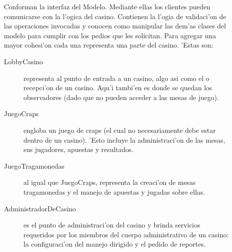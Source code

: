 
\begin{description}
\item[] Conforman la interfaz del Modelo. Mediante ellas los clientes pueden comunicarse con la l'ogica del casino. Contienen la l'ogia de validaci'on de las operaciones invocadas y conocen como manipular las dem'as clases del modelo para cumplir con los pedios que les solicitan. Para agregar una mayor cohesi'on cada una representa una parte del casino. 'Estas son:
	\begin{description}
	\item[LobbyCasino] representa al punto de entrada a un casino, algo asi como el  o recepci'on de un casino. Aqu'i tambi'en es donde se quedan los observadores (dado que no pueden acceder a las mesas de juego).
	\item[JuegoCraps] engloba un juego de craps (el cual no necesariamente debe estar dentro de un casino). 'Esto incluye la administraci'on de las mesas, sus jugadores, apuestas y resultados.
	\item[JuegoTragamonedas] al igual que JuegoCraps, representa la creaci'on de mesas tragamonedas y el manejo de apuestas y jugadas sobre ellas.
	\item[AdministradorDeCasino] es el punto de administraci'on del casino y brinda servicios requeridos por los miembros del cuerpo administrativo de un casino: la configuraci'on del manejo dirigido y el pedido de reportes.
	\end{description}


\end{description}
